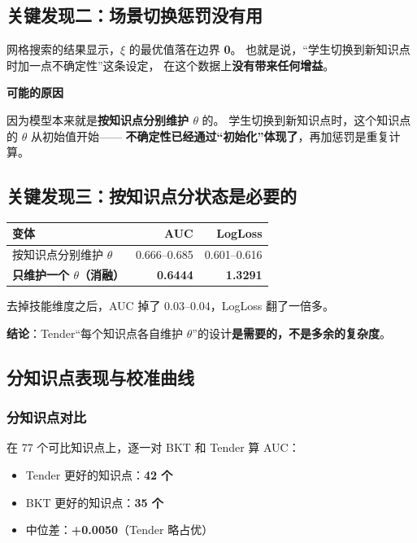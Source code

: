\documentclass[UTF8,a4paper,11pt]{ctexart}
\newenvironment{explainbox}[1]
{\begin{center}\begin{minipage}{0.94\textwidth}\colorbox{boxbg}{\parbox{0.92\textwidth}{\textbf{#1}\par\vspace{2pt}}}}
{\end{minipage}\end{center}}
\newcommand{\hl}[1]{\textcolor{blue!70!black}{\textbf{#1}}}
\newcommand{\warn}[1]{\textcolor{red!70!black}{\textbf{#1}}}
\begin{document}
\subsection{关键发现二：场景切换惩罚没有用}

网格搜索的结果显示，$\xi$ 的最优值落在边界 \textbf{0}。
也就是说，“学生切换到新知识点时加一点不确定性”这条设定，
在这个数据上\warn{没有带来任何增益}。

\begin{explainbox}{可能的原因}
因为模型本来就是\textbf{按知识点分别维护 $\theta$} 的。
学生切换到新知识点时，这个知识点的 $\theta$ 从初始值开始——
\textbf{不确定性已经通过“初始化”体现了}，再加惩罚是重复计算。
\end{explainbox}

\subsection{关键发现三：按知识点分状态是必要的}

\begin{center}
\begin{tabular}{p{5.4cm}rr}
\toprule
\textbf{变体} & \textbf{AUC} & \textbf{LogLoss} \\
\midrule
按知识点分别维护 $\theta$ & 0.666–0.685 & 0.601–0.616 \\
\textbf{只维护一个 $\theta$（消融）} & \warn{0.6444} & \warn{1.3291} \\
\bottomrule
\end{tabular}
\end{center}

去掉技能维度之后，AUC 掉了 0.03–0.04，LogLoss 翻了一倍多。

\textbf{结论}：Tender“每个知识点各自维护 $\theta$”的设计\hl{是需要的，不是多余的复杂度}。

\subsection{分知识点表现与校准曲线}

\subsubsection{分知识点对比}

在 77 个可比知识点上，逐一对 BKT 和 Tender 算 AUC：

\begin{itemize}[leftmargin=1.6em]
\item Tender 更好的知识点：\textbf{42 个}
\item BKT 更好的知识点：\textbf{35 个}
\item 中位差：\textbf{+0.0050}（Tender 略占优）
\end{itemize}
\end{document}
